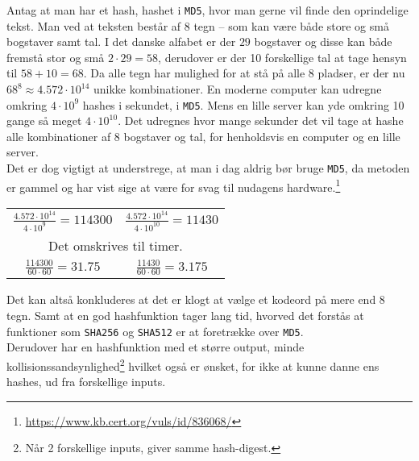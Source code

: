 \begin{eks}
    \label{brutefc}
    Antag at man har et hash, hashet i \texttt{MD5}, hvor man gerne vil finde den oprindelige tekst.
    Man ved at teksten består af 8 tegn -- som kan være både store og små bogstaver samt tal.
    I det danske alfabet er der \(29\) bogstaver og disse kan både fremstå stor og små \(2 \cdot 29 = 58\), derudover er der 10 forskellige tal at tage hensyn til \(58 + 10 = 68\).
    Da alle tegn har mulighed for at stå på alle 8 pladser, er der nu \(68^8\approx 4.572 \cdot 10^{14}\) unikke kombinationer.
    En moderne computer kan udregne omkring \(4 \cdot 10^9\) hashes i sekundet, i \texttt{MD5}.
    Mens en lille server kan yde omkring 10 gange så meget \(4 \cdot 10^{10}\).\cite{ytpwd}
    Det udregnes hvor mange sekunder det vil tage at hashe alle kombinationer af 8 bogstaver og tal, for henholdsvis en computer og en lille server.\\
    Det er dog vigtigt at understrege, at man i dag aldrig bør bruge \texttt{MD5}, da metoden er gammel og har vist sige at være for svag til nudagens hardware.\footnote{\url{https://www.kb.cert.org/vuls/id/836068/}}

    \setlength{\tabcolsep}{50pt} %
    \begin{center}
        \begin{tabular}{c c}

            \(\frac{4.572 \cdot 10^{14}}{4 \cdot 10^9} = 114300\) &
            \(\frac{4.572 \cdot 10^{14}}{4 \cdot 10^{10}} = 11430\)\\

            \multicolumn{2}{c}{Det omskrives til timer.}\\

            \(\frac{114300}{60 \cdot 60} = 31.75\) &
            \(\frac{11430}{60 \cdot 60} = 3.175\)\\

        \end{tabular}
    \end{center}

    Det kan altså konkluderes at det er klogt at vælge et kodeord på mere end 8 tegn.
    Samt at en god hashfunktion tager lang tid, hvorved det forstås at funktioner som \texttt{SHA256} og \texttt{SHA512} er at foretrække over \texttt{MD5}.\\
    Derudover har en hashfunktion med et større output, minde kollisionssandsynlighed\footnote{Når 2 forskellige inputs, giver samme hash-digest.} hvilket også er ønsket, for ikke at kunne danne ens hashes, ud fra forskellige inputs.
\end{eks}



